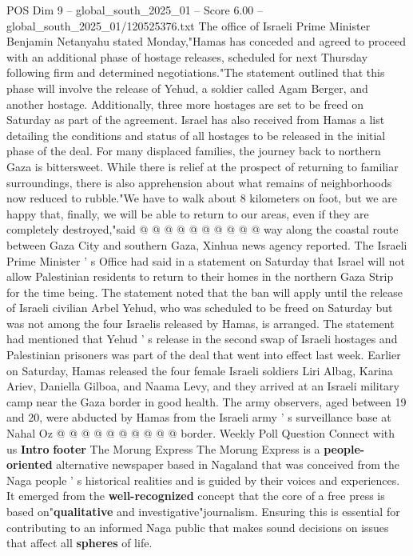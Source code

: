 \begin{textsample}{POS Dim 9 – global\_south\_2025\_01 – Score 6.00 – global\_south\_2025\_01/120525376.txt}  \label{ex:f9_pos_345}
The office of Israeli Prime Minister Benjamin Netanyahu stated Monday,"Hamas has conceded and agreed to proceed with an additional phase of hostage releases, scheduled for next Thursday following firm and determined negotiations."The statement outlined that this phase will involve the release of Yehud, a soldier called Agam Berger, and another hostage.
Additionally, three more hostages are set to be freed on Saturday as part of the agreement.
Israel has also received from Hamas a list detailing the conditions and status of all hostages to be released in the initial phase of the deal.
For many displaced families, the journey back to northern Gaza is bittersweet.
While there is relief at the prospect of returning to familiar surroundings, there is also apprehension about what remains of neighborhoods now reduced to rubble."We have to walk about 8 kilometers on foot, but we are happy that, finally, we will be able to return to our areas, even if they are completely destroyed,"said @ @ @ @ @ @ @ @ @ @ way along the coastal route between Gaza City and southern Gaza, Xinhua news agency reported.
The Israeli Prime Minister ' s Office had said in a statement on Saturday that Israel will not allow Palestinian residents to return to their homes in the northern Gaza Strip for the time being.
The statement noted that the ban will apply until the release of Israeli civilian Arbel Yehud, who was scheduled to be freed on Saturday but was not among the four Israelis released by Hamas, is arranged.
The statement had mentioned that Yehud ' s release in the second swap of Israeli hostages and Palestinian prisoners was part of the deal that went into effect last week.
Earlier on Saturday, Hamas released the four female Israeli soldiers Liri Albag, Karina Ariev, Daniella Gilboa, and Naama Levy, and they arrived at an Israeli military camp near the Gaza border in good health.
The army observers, aged between 19 and 20, were abducted by Hamas from the Israeli army ' s surveillance base at Nahal Oz @ @ @ @ @ @ @ @ @ @ border.
Weekly Poll Question Connect with us \textbf{Intro} \textbf{footer} The Morung Express The Morung Express is a \textbf{people-oriented} alternative newspaper based in Nagaland that was conceived from the Naga people ' s historical realities and is guided by their voices and experiences.
It emerged from the \textbf{well-recognized} concept that the core of a free press is based on"\textbf{qualitative} and investigative"journalism.
Ensuring this is essential for contributing to an informed Naga public that makes sound decisions on issues that affect all \textbf{spheres} of life.

\end{textsample}
